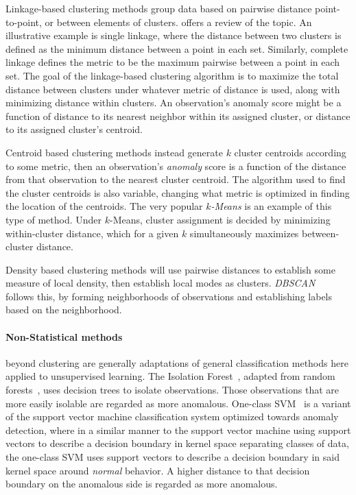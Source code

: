 Linkage-based clustering methods group data based on pairwise distance 
    point-to-point, or between elements of clusters.  \cite{ackerman2010} offers
    a review of the topic.  An illustrative example is single linkage, where 
    the distance between two clusters is defined as the minimum distance 
    between a point in each set.   Similarly, complete linkage defines the 
    metric to be the maximum pairwise between a point in each set.  The goal of 
    the linkage-based clustering algorithm is to maximize the total distance 
    between clusters under whatever metric of distance is used, along with 
    minimizing distance within clusters.  An observation's anomaly score might 
    be a function of distance to its nearest neighbor within its assigned 
    cluster, or distance to its assigned cluster's centroid.

Centroid based clustering methods instead generate $k$ cluster centroids 
    according to some metric, then an observation's \emph{anomaly} score is a 
    function of the distance from that observation to the nearest cluster 
    centroid.  The algorithm used to find the cluster centroids is also 
    variable, changing what metric is optimized in finding the location of the
    centroids.  The very popular \emph{$k$-Means} \citep{hartigan1979} is an 
    example of this type of method.  Under $k$-Means, cluster assignment is 
    decided by minimizing within-cluster distance, which for a given $k$ 
    simultaneously maximizes between-cluster distance.

Density based clustering methods will use pairwise distances to establish some 
    measure of local density, then establish local modes as clusters.
    \emph{DBSCAN}~\citep{ester1996} follows this, by forming neighborhoods of 
    observations and establishing labels based on the neighborhood.

\paragraph{Non-Statistical methods} beyond clustering are generally adaptations 
    of general classification methods here applied to unsupervised learning.  
    The Isolation Forest~\citep{liu2000}, adapted from random 
    forests~\citep{breiman2001}, uses decision trees to isolate observations.
    Those observations that are more easily isolable are regarded as more 
    anomalous.  One-class SVM~\citep{chang2011} is a variant of the support 
    vector machine classification system optimized towards anomaly detection, 
    where in a similar manner to the support vector machine using support 
    vectors to describe a decision boundary in kernel space separating classes 
    of data, the one-class SVM uses support vectors to describe a decision 
    boundary in said kernel space around \emph{normal} behavior. A higher 
    distance to that decision boundary on the anomalous side is regarded as 
    more anomalous.

